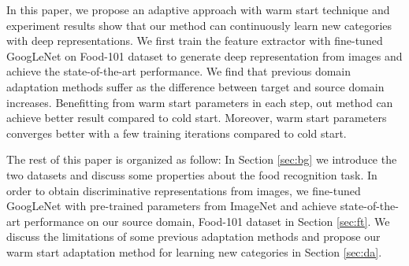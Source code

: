 In this paper, we propose an adaptive approach with warm start technique and experiment results show that our method can continuously learn new categories with deep representations. We first train the feature extractor with fine-tuned GoogLeNet on Food-101 dataset to generate deep representation from images and achieve the state-of-the-art performance. 
We find that previous domain adaptation methods suffer as the difference between target and source domain increases. Benefitting from warm start parameters in each step, out method can achieve better result compared to cold start. Moreover, warm start parameters converges better with a few training iterations compared to cold start. 

The rest of this paper is organized as follow: In Section \ref{sec:bg} we introduce the two datasets and discuss some properties about the food recognition task. In order to obtain discriminative representations from images, we fine-tuned GoogLeNet with pre-trained parameters from ImageNet and achieve state-of-the-art performance on our source domain, Food-101 dataset in Section \ref{sec:ft}. We discuss the limitations of some previous adaptation methods and propose our warm start adaptation method for learning new categories in Section \ref{sec:da}.
